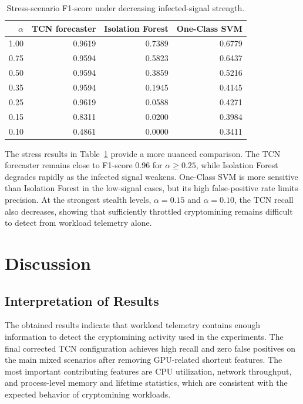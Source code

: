 \documentclass[a4paper,12pt]{extarticle}
\begin{document}
\begin{table}[H]
\caption{Stress-scenario F1-score under decreasing infected-signal strength.}
\label{tab:stress_scenarios}
\centering
\small
\begin{tabular}{rrrr}
\toprule
$\alpha$ & TCN forecaster & Isolation Forest & One-Class SVM \\
\midrule
1.00 & 0.9619 & 0.7389 & 0.6779 \\
0.75 & 0.9594 & 0.5823 & 0.6437 \\
0.50 & 0.9594 & 0.3859 & 0.5216 \\
0.35 & 0.9594 & 0.1945 & 0.4145 \\
0.25 & 0.9619 & 0.0588 & 0.4271 \\
0.15 & 0.8311 & 0.0200 & 0.3984 \\
0.10 & 0.4861 & 0.0000 & 0.3411 \\
\bottomrule
\end{tabular}
\end{table}

The stress results in Table~\ref{tab:stress_scenarios} provide a more nuanced comparison. The TCN forecaster remains close to F1-score 0.96 for $\alpha \geq 0.25$, while Isolation Forest degrades rapidly as the infected signal weakens. One-Class SVM is more sensitive than Isolation Forest in the low-signal cases, but its high false-positive rate limits precision. At the strongest stealth levels, $\alpha=0.15$ and $\alpha=0.10$, the TCN recall also decreases, showing that sufficiently throttled cryptomining remains difficult to detect from workload telemetry alone.

\section{Discussion}
\label{sec:discussion}

\subsection{Interpretation of Results}

The obtained results indicate that workload telemetry contains enough information to detect the cryptomining activity used in the experiments. The final corrected TCN configuration achieves high recall and zero false positives on the main mixed scenarios after removing GPU-related shortcut features. The most important contributing features are CPU utilization, network throughput, and process-level memory and lifetime statistics, which are consistent with the expected behavior of cryptomining workloads.
\end{document}
